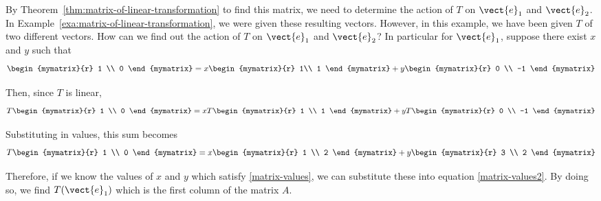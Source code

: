 \begin{solution} By Theorem~\ref{thm:matrix-of-linear-transformation} to find this matrix, we need to determine the action of $T$ on
$\vect{e}_{1}$ and $\vect{e}_{2}$. In Example~\ref{exa:matrix-of-linear-transformation}, we were given these resulting vectors.
However, in this example, we have been given $T$ of two different vectors. How can we find out the action
of $T$ on $\vect{e}_{1}$ and $\vect{e}_{2}$? In particular for $\vect{e}_{1}$, suppose there exist $x$ and $y$ such that
\begin{equation}
\begin{mymatrix}{r}
1 \\
0
\end{mymatrix} = x\begin{mymatrix}{r}
1\\
1
\end{mymatrix} +y\begin{mymatrix}{r}
0 \\
-1 
\end{mymatrix} 
\label{matrix-values}
\end{equation}

Then, since $T$ is linear,
\begin{equation*}
T\begin{mymatrix}{r}
1 \\
0 
\end{mymatrix}  = x T\begin{mymatrix}{r}
1 \\
1
\end{mymatrix} +y T\begin{mymatrix}{r}
0 \\
-1 
\end{mymatrix}
\end{equation*}

Substituting in values, this sum becomes
\begin{equation}
T\begin{mymatrix}{r}
1 \\
0 
\end{mymatrix} = 
 x\begin{mymatrix}{r}
1 \\
2
\end{mymatrix} +y\begin{mymatrix}{r}
3 \\
2
\end{mymatrix} 
\label{matrix-values2}
\end{equation}

Therefore, if we know the values of $x$ and $y$ which satisfy {\eqref{matrix-values}}, we can substitute these into equation {\eqref{matrix-values2}}. By doing so,
we find $T(\vect{e}_1)$ which is the first column of the matrix $A$. 


\end{solution}

